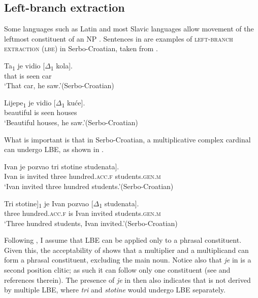 \documentclass[output=paper]{langscibook}
\begin{document}
\subsection{Left-branch extraction}\label{tat:sec:lbe}
Some languages such as Latin and most Slavic languages allow movement of the leftmost constituent of an NP \citep{Ross1986}. Sentences in  are examples of \textsc{left-branch extraction (lbe)} in Serbo-Croatian, taken from \citet{Boskovic2005}.

\ea\label{tat:lbe}
\ea\label{tat:ex:lbea}
\gll Ta\textsubscript{$1$} je vidio [$\Delta$\textsubscript{$1$} kola].\\  
     that is seen {} car\\ 
\glt `That car, he saw.'\hfill (Serbo-Croatian)

\ex\label{tat:ex:lbeb}
\gll Lijepe\textsubscript{$1$} je vidio [$\Delta$\textsubscript{$1$} kuće].\\  
     beautiful is seen {} houses\\ 
\glt `Beautiful houses, he saw.'\hfill (Serbo-Croatian)
\z\z	

\noindent What is important is that in Serbo-Croatian, a multiplicative complex cardinal can undergo LBE, as shown in .

\ea
\ea
\gll Ivan je pozvao \minsp{[} {tri} {stotine} studenata].\\  
     Ivan is invited {} three hundred.\textsc{acc.f} students.\textsc{gen.m}\\ 
\glt `Ivan invited three hundred students.'\hfill (Serbo-Croatian)

\ex\label{tat:lbe2}
\gll \minsp{[} {Tri} {stotine}]\textsubscript{$1$} je Ivan pozvao [$\Delta$\textsubscript{$1$} studenata].\\  
     {} three hundred.\textsc{acc.f} is Ivan invited {} students.\textsc{gen.m}\\ 
\glt `Three hundred students, Ivan invited.'\hfill (Serbo-Croatian)
\z\z	

\noindent Following \citet{Corver1992}, I assume that LBE can be applied only to a phrasal constituent. Given this, the acceptability of  shows that a multiplier and a multiplicand can form a phrasal constituent, excluding the main noun. Notice also that \textit{je} in  is a second position clitic; as such it can follow only one constituent (see \citealt{Boskovic2001} and references therein). The presence of \textit{je} in  then also indicates that  is not derived by multiple LBE, where \textit{tri} and \textit{stotine} would undergo LBE separately.
\end{document}
